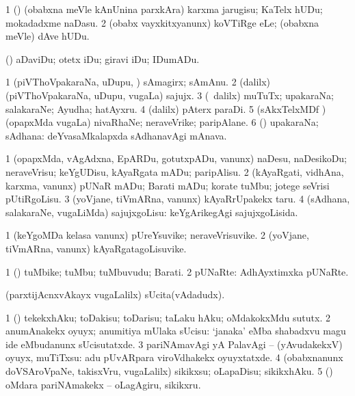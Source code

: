 \bentry
{}
\gl{\sakirx}
\bmng
\bnum
\num{1} (\nAyxshA) (obabxna meVle kAnUnina parxkAra) karxma jarugisu; KaTelx hUDu; mokadadxme naDasu. 
\num{2} (obabx vayxkitxyanunx) koVTiRge eLe; (obabxna meVle) dAve hUDu. 
\enum
\emng
\eentry

\bentry
{}
\gl{\sakirx}
\bmng
(\pArxparx) aDaviDu; otetx iDu; giravi iDu; IDumADu. 
\emng
\eentry

\bentry
{}
\gl{\nA}
\bmng
\bnum
\num{1} (piVThoVpakaraNa, uDupu, \mo) sAmagirx; sAmAnu. 
\num{2} (\bava dalilx) (piVThoVpakaraNa, uDupu, \mo vugaLa) sajujx. 
\num{3} (\kanmu\ \bava dalilx) muTuTx; upakaraNa; salakaraNe; Ayudha; hatAyxru. 
\num{4} (\bava dalilx) pAterx paraDi. 
\num{5} (sAkxTelxMDf \nAyxshA) (opapxMda \mo vugaLa) nivaRhaNe; neraveVrike; paripAlane. 
\num{6} (\rUpa) upakaraNa; sAdhana:  deYvasaMkalapxda sAdhanavAgi mAnava. 
\enum
\emng
\eentry

\bentry
{}
\gl{\sakirx}
\bmng
\bnum
\num{1} (opapxMda, vAgAdxna, EpARDu, gotutxpADu, \mo vanunx) naDesu, naDesikoDu; neraveVrisu; keYgUDisu, kAyaRgata mADu; paripAlisu. 
\num{2} (kAyaRgati, vidhAna, karxma, \mo vanunx) pUNaR mADu; Barati mADu; korate tuMbu; jotege seVrisi pUtiRgoLisu. 
\num{3} (yoVjane, tiVmARna, \mo vanunx) kAyaRrUpakekx taru. 
\num{4} (sAdhana, salakaraNe, \mo vugaLiMda) sajujxgoLisu:  keYgArikegAgi sajujxgoLisida. 
\enum
\emng
\eentry

\bentry
{}
\gl{\nA}
\bmng
\bnum
\num{1} (keYgoMDa kelasa \mo vanunx) pUreYsuvike; neraveVrisuvike. 
\num{2} (yoVjane, tiVmARna, \mo vanunx) kAyaRgatagoLisuvike. 
\enum
\emng
\eentry

\bentry
{}
\gl{\nA}
\bmng
\bnum
\num{1} (\pArxparx) tuMbike; tuMbu; tuMbuvudu; Barati. 
\num{2} pUNaRte:  AdhAyxtimxka pUNaRte. 
\enum
\emng
\eentry

\bentry
{}
\gl{\nA}
\bmng
(parxtijAcnxvAkayx \mo vugaLalilx) sUcita(vAdadudx). 
\emng
\eentry

\bentry
{}
\gl{\sakirx}
\bmng
\bnum
\num{1} (\pArxparx) tekekxhAku; toDakisu; toDarisu; taLaku hAku; oMdakokxMdu sututx. 
\num{2} anumAnakekx oyuyx; anumitiya mUlaka sUcisu:  `janaka' eMba shabadxvu magu ide eMbudanunx sUcisutatxde. 
\num{3} pariNAmavAgi yA PalavAgi -- (yAvudakekxV) oyuyx, muTiTxsu:  adu pUvARpara viroVdhakekx oyuyxtatxde. 
\num{4} (obabxnanunx doVSAroVpaNe, takisxVru, \mo vugaLalilx) sikikxsu; oLapaDisu; sikikxhAku. 
\num{5} (\kaparx) oMdara pariNAmakekx -- oLagAgiru, sikikxru. 
\enum
\emng
\eentry

